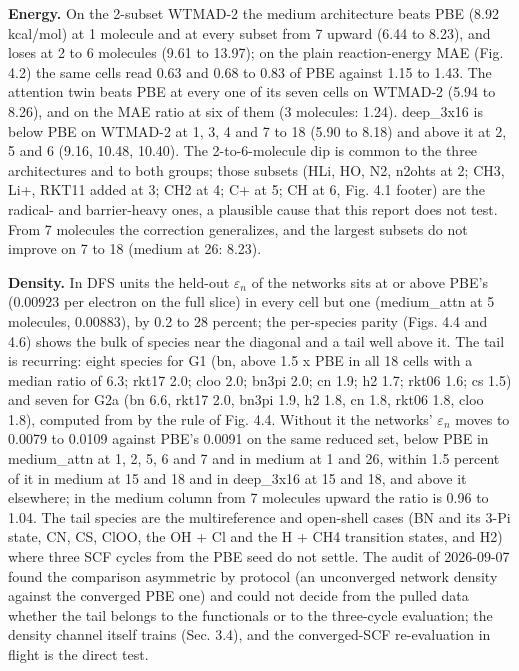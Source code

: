 \documentclass[10pt,a4paper]{article}
\begin{document}
\textbf{Energy.} On the 2-subset WTMAD-2 the medium architecture beats PBE (8.92 kcal/mol) at 1
molecule and at every subset from 7 upward (6.44 to 8.23), and loses at 2 to 6 molecules (9.61
to 13.97); on the plain reaction-energy MAE (Fig. 4.2) the same cells read 0.63 and 0.68 to 0.83
of PBE against 1.15 to 1.43. The attention twin beats PBE at every one of its seven cells on
WTMAD-2 (5.94 to 8.26), and on the MAE ratio at six of them (3 molecules: 1.24). deep\_3x16
is below PBE on WTMAD-2 at 1, 3, 4 and 7 to 18 (5.90 to 8.18) and above it at 2, 5 and 6 (9.16,
10.48, 10.40). The 2-to-6-molecule dip is common to the three architectures and to both groups;
those subsets (HLi, HO, N2, n2ohts at 2; CH3, Li+, RKT11 added at 3; CH2 at 4; C+ at 5; CH at 6,
Fig. 4.1 footer) are the radical- and barrier-heavy ones, a plausible cause that this report
does not test. From 7 molecules the correction generalizes, and the largest subsets do not
improve on 7 to 18 (medium at 26: 8.23).

\textbf{Density.} In DFS units the held-out $\varepsilon_n$ of the networks sits at or above PBE's
(0.00923 per electron on the full slice) in every cell but one (medium\_attn at 5 molecules,
0.00883), by 0.2 to 28 percent; the per-species parity (Figs. 4.4 and 4.6) shows the bulk of
species near the diagonal and a tail well above it. The tail is recurring: eight species for G1
(bn, above 1.5 x PBE in all 18 cells with a median ratio of 6.3; rkt17 2.0; cloo 2.0; bn3pi 2.0;
cn 1.9; h2 1.7; rkt06 1.6; cs 1.5) and seven for G2a (bn 6.6, rkt17 2.0, bn3pi 1.9, h2 1.8,
cn 1.8, rkt06 1.8, cloo 1.8), computed from  by the rule
of Fig. 4.4. Without it the networks' $\varepsilon_n$ moves to 0.0079 to 0.0109 against PBE's
0.0091 on the same reduced set, below PBE in medium\_attn at 1, 2, 5, 6 and 7 and in medium at 1 and 26,
within 1.5 percent of it in medium at 15 and 18 and in deep\_3x16 at 15 and 18, and above it
elsewhere; in the medium column from 7 molecules upward the ratio is 0.96 to 1.04. The tail species are the multireference and
open-shell cases (BN and its 3-Pi state, CN, CS, ClOO, the OH + Cl and the H + CH4 transition
states, and H2) where three SCF cycles from the PBE seed do not settle. The audit of 2026-09-07
found the comparison asymmetric by protocol (an unconverged network density against the
converged PBE one) and could not decide from the pulled data whether the tail belongs to the
functionals or to the three-cycle evaluation; the density channel itself trains (Sec. 3.4), and
the converged-SCF re-evaluation in flight is the direct test.
\end{document}
